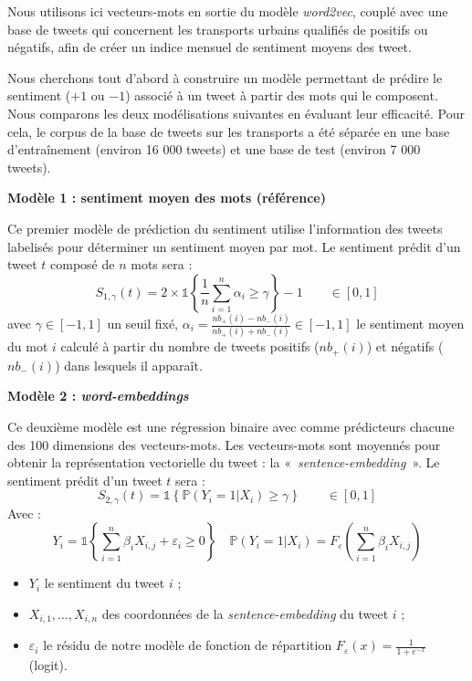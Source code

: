 \documentclass[10pt,french,french]{article}
\begin{document}
Nous utilisons ici vecteurs-mots en sortie du modèle \emph{word2vec}, couplé avec une base de tweets qui concernent les transports urbains qualifiés de positifs ou négatifs, afin de créer un indice mensuel de sentiment moyens des tweet.

Nous cherchons tout d'abord à construire un modèle permettant de prédire le sentiment (\(+1\) ou \(-1\)) associé à un tweet à partir des mots qui le composent. Nous comparons les deux modélisations suivantes en évaluant leur efficacité. Pour cela, le corpus de la base de tweets sur les transports a été séparée en une base d'entraînement (environ 16 000 tweets) et une base de test (environ 7 000 tweets).

\begin{multicols}{2}

\textbf{Modèle 1 : sentiment moyen des mots (référence)}

Ce premier modèle de prédiction du sentiment utilise l'information des tweets labelisés pour déterminer un sentiment moyen par mot.
Le sentiment prédit d'un tweet $t$ composé de $n$ mots sera :
$$S_{1,\gamma}(t) = 2 \times \mathds{1}\left\{ \frac{1}{n} \sum \limits_{i=1}^n \alpha_i \geq \gamma\right\} - 1 \qquad \in [0,1]$$
  avec $\gamma \in [-1,1]$ un seuil fixé, $\alpha_i = \frac{nb_+(i) - nb_-(i)}{nb_+(i) + nb_-(i)} \in [-1,1]$  le sentiment moyen du mot $i$ calculé à partir du nombre de tweets positifs ($nb_+(i)$) et négatifs ($nb_-(i)$) dans lesquels il apparaît.

\vspace{2.5cm}

\textbf{Modèle 2 : \emph{word-embeddings}}

Ce deuxième modèle est une régression binaire avec comme prédicteurs chacune des 100 dimensions des vecteurs-mots. Les vecteurs-mots sont moyennés pour obtenir la représentation vectorielle du tweet : la  « \emph{sentence-embedding} ».
Le sentiment prédit d'un tweet $t$ sera :
 $$S_{2,\gamma}(t) =\mathds{1}\left\{   \mathbb{P}(Y_i = 1 | X_{i}) \ge \gamma\right\} \qquad \in [0,1]$$
Avec : 
$$Y_i = \mathds{1}\left\{ \sum_{i = 1}^n \beta_i X_{i,j} + \varepsilon_i \geq 0 \right\} 
\quad  \mathbb{P}(Y_i = 1 | X_{i}) = F_{\varepsilon}\left(\sum_{i = 1}^n \beta_i X_{i,j}\right)$$
\begin{itemize}
\item $Y_i$ le sentiment du tweet $i$ ;
\item $X_{i,1}, \dots, X_{i,n}$ des coordonnées de la \emph{sentence-embedding} du tweet $i$ ;
\item $\varepsilon_i$ le résidu de notre modèle de fonction de répartition $F_{\varepsilon}(x) = \frac{1}{1 + e^{-x}}$ (logit).
\end{itemize}

 \end{multicols}
\end{document}
